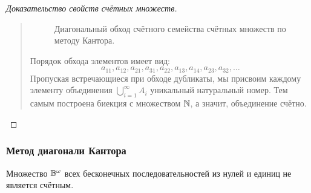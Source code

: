 \begin{proof}[Доказательство свойств счётных множеств]
\begin{quote}
\begin{figure}[H]
            \caption{Диагональный обход счётного семейства счётных множеств 
            по методу Кантора.}
        \end{figure}

        Порядок обхода элементов имеет вид:
        \[
            a_{11}, a_{12}, a_{21}, a_{31}, a_{22}, a_{13}, a_{14}, 
            a_{23}, a_{32}, \dots
        \]
        Пропуская встречающиеся при обходе дубликаты, мы присвоим каждому 
        элементу объединения $\bigcup_{i=1}^\infty A_i$ уникальный 
        натуральный номер. Тем самым построена биекция с множеством $\mathbb{N}$, 
        а значит, объединение счётно.
    \end{quote}
\end{proof}

\subsubsection{Метод диагонали Кантора}

\begin{theorem}
    Множество $\mathbb{B}^\omega$ всех бесконечных последовательностей из нулей 
    и единиц не является счётным.
\end{theorem}

